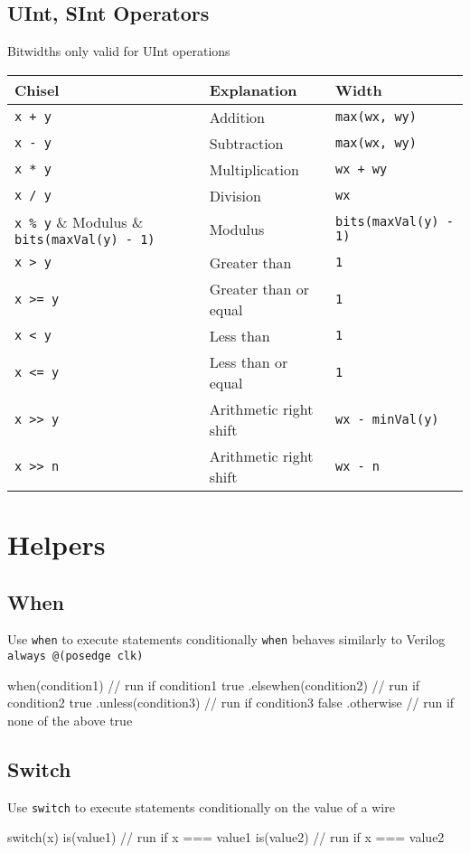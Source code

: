 \documentclass[10pt,landscape]{article}
\begin{document}
\begin{multicols}{3}
\subsection{UInt, SInt Operators}
Bitwidths only valid for UInt operations

\begin{tabular}{l l l}
Chisel & Explanation & Width \\
\hline
\hline
\verb$x + y$ & Addition & \verb$max(wx, wy)$ \\
\verb$x - y$ & Subtraction & \verb$max(wx, wy)$ \\
\verb$x * y$ & Multiplication & \verb$wx + wy$ \\
\verb$x / y$ & Division & \verb$wx$ \\
\verb$x % y$ & Modulus & \verb$bits(maxVal(y) - 1)$ \\
\hline
\verb$x > y$ & Greater than & \verb$1$ \\
\verb$x >= y$ & Greater than or equal & \verb$1$ \\
\verb$x < y$ & Less than & \verb$1$ \\
\verb$x <= y$ & Less than or equal & \verb$1$ \\
\hline
\verb$x >> y$ & Arithmetic right shift & \verb$wx - minVal(y)$ \\
\verb$x >> n$ & Arithmetic right shift & \verb$wx - n$ \\
\end{tabular}

\section{Helpers}
\subsection{When}
Use \verb$when$ to execute statements conditionally \newline
\verb$when$ behaves similarly to Verilog \newline \verb$always @(posedge clk)$
\begin{scala}
when(condition1) {
  // run if condition1 true
} .elsewhen(condition2) {
  // run if condition2 true
} .unless(condition3) {
  // run if condition3 false
} .otherwise {
  // run if none of the above true
}
\end{scala}

\subsection{Switch}
Use \verb$switch$ to execute statements conditionally \newline
on the value of a wire \newline
\begin{scala}
switch(x) {
  is(value1) {
    // run if x === value1
  } is(value2) {
    // run if x === value2
  }
}
\end{scala}


\end{multicols}
\end{document}
